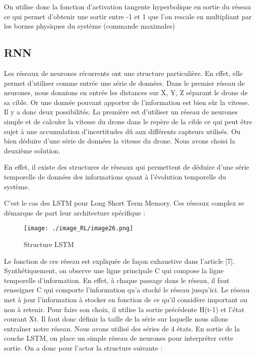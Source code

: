 On utilise donc la fonction d’activation tangente hyperbolique en sortie du réseau ce qui permet d’obtenir une sortir entre -1 et 1 que l’on rescale en multipliant par les bornes physiques du système (commande maximales)

\subsection{RNN}

Les réseaux de neurones récurrents ont une structure particulière. En effet, elle permet d’utiliser comme entrée une série de données. Dans le premier réseau de neurones, nous donnions en entrée les distances sur X, Y, Z séparant le drone de sa cible.
Or une donnée pouvant apporter de l’information est bien sûr la vitesse.
Il y a donc deux possibilités. La première est d'utiliser un réseau de neurones simple et de calculer la vitesse du drone dans le repère de la cible ce qui peut être sujet à une accumulation d’incertitudes dû aux différents capteurs utilisés.
Ou bien déduire d’une série de données la vitesse du drone.
Nous avons choisi la deuxième solution. 

En effet, il existe des structures de réseaux qui permettent de déduire d’une série temporelle de données des informations quant à l’évolution temporelle du système.

C’est le cas des LSTM pour Long Short Term Memory. Ces réseaux complex se démarque de part leur architecture spécifique :

\begin{figure}[H]
    \centering
    \texttt{[image: ./image\_RL/image26.png]}
    \caption{Structure LSTM}
\end{figure}

Le fonction de ces réseau est expliquée de façon exhaustive dans l’article [7].
Synthétiquement, on observe une ligne principale C qui compose la ligne temporelle d’information. En effet, à chaque passage dans le réseau, il faut renseigner C qui comporte l’information qu'a stocké le réseau jusqu’ici. Le réseau met à jour l’information à stocker en fonction de ce qu'il considère important ou non à retenir. Pour faire son choix, il utilise la sortie précédente H(t-1) et l’état courant Xt.
Il faut donc définir la taille de la série sur laquelle nous allons entraîner notre réseau. Nous avons utilisé des séries de 4 états.
En sortie de la couche LSTM, on place un simple réseau de neurones pour interpréter cette sortie.
On a donc pour l’actor la structure suivante :

